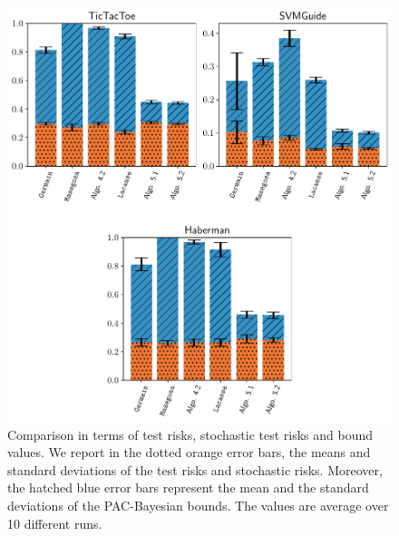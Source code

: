 \begin{figure}
    \centering
    \includegraphics[width=1.0\linewidth]{chapter_5/figures/stump_binary_2.pdf}
    \caption[Comparison of the Risks and the Bound Values (2/4)]{
    Comparison in terms of test risks, stochastic test risks and bound values. 
    We report in the dotted orange error bars, the means and standard deviations of the test risks and stochastic risks.
    Moreover, the hatched blue error bars represent the mean and the standard deviations of the PAC-Bayesian bounds.
    The values are average over 10 different runs.
    }
    \label{chap:mv-sto:fig:stump-binary-2}
\end{figure}

